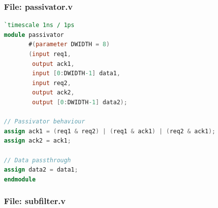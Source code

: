 \documentclass[a4paper,twoside,11pt, fleqn]{article}
\begin{document}
\newpage
\subsubsection{File: passivator.v}
\begin{lstlisting}[language=Verilog]
`timescale 1ns / 1ps
module passivator
       #(parameter DWIDTH = 8)
       (input req1,
        output ack1,
        input [0:DWIDTH-1] data1,
        input req2,
        output ack2,
        output [0:DWIDTH-1] data2);

// Passivator behaviour
assign ack1 = (req1 & req2) | (req1 & ack1) | (req2 & ack1);
assign ack2 = ack1;

// Data passthrough
assign data2 = data1;
endmodule
\end{lstlisting}

\subsubsection{File: subfilter.v}
\end{document}
